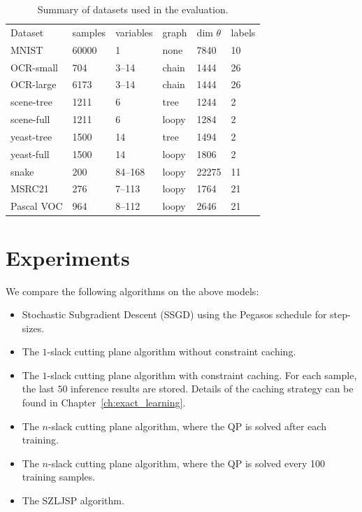 \begin{table}
    \begin{tabu} to 
    \toprule
    Dataset    & {samples} & variables & graph & {dim $\theta$} & {labels}\\
    MNIST      & 60000   & 1     & none  & 7840  & 10\\
    OCR-small  & 704     & 3--14 & chain & 1444  & 26\\
    OCR-large  & 6173    & 3--14 & chain & 1444  & 26\\
    scene-tree & 1211    & 6     & tree  & 1244  & 2\\
    scene-full & 1211    & 6     & loopy & 1284  & 2\\
    yeast-tree & 1500    & 14    & tree  & 1494  & 2\\
    yeast-full & 1500    & 14    & loopy & 1806  & 2\\
    snake      & 200     &84--168& loopy & 22275 & 11\\
    MSRC21     & 276     & 7--113& loopy &  1764 & 21\\
    Pascal VOC & 964     & 8--112& loopy &  2646 & 21\\
    \bottomrule
    \end{tabu}
    \caption{Summary of datasets used in the evaluation. }
\end{table}

\section{Experiments}
We compare the following algorithms on the above models:
\begin{itemize}
    \item Stochastic Subgradient Descent (SSGD) using the Pegasos schedule for step-sizes.
    \item The $1$-slack cutting plane algorithm without constraint caching.
    \item The $1$-slack cutting plane algorithm with constraint caching. For
            each sample, the last $50$ inference results are stored.
            Details of the caching strategy can be found in Chapter~\ref{ch:exact_learning}.
    \item The $n$-slack cutting plane algorithm, where the QP is solved after each training.
    \item The $n$-slack cutting plane algorithm, where the QP is solved every 100 training samples.
    \item The SZLJSP algorithm.
\end{itemize}

